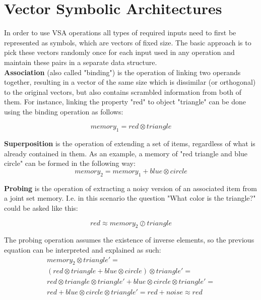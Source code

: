 \documentclass[conference]{IEEEtran}
\begin{document}
	\section{Vector Symbolic Architectures}
	
In order to use VSA operations all types of required inputs need to first be represented as symbols, which are vectors of fixed size. The basic approach is to pick these vectors randomly once for each input used in any operation and maintain these pairs in a separate data structure.	
	\\
	
	\textbf{Association} (also called "binding") is the operation of linking two operands together, resulting in a vector of the same size which is dissimilar (or orthogonal) to the original vectors, but also contains scrambled information from both of them.
For instance, linking the property "red" to object "triangle" can be done using the binding operation as follows:
	
	\begin{equation}
	memory_1 = red \otimes triangle
	\end{equation}
	
	\textbf{Superposition} is the operation of extending a set of items, regardless of what is already contained in them.
As an example, a memory of "red triangle and blue circle" can be formed in the following way:
	\begin{equation}
	memory_2 = memory_1 + blue \otimes circle
	\end{equation}
	
	\textbf{Probing} is the operation of extracting a noisy version of an associated item from a joint set memory.
I.e. in this scenario the question "What color is the triangle?" could be asked like this:
	
	\begin{equation}
	red \approx memory_2 \oslash triangle
	\end{equation}
	
	
	The probing operation assumes the existence of inverse elements, so the previous equation can be interpreted and explained as such:
	\begin{multline}
	memory_2 \otimes triangle'=\\
	(red \otimes triangle + blue \otimes circle) \otimes triangle'=\\
	red \otimes triangle  \otimes triangle' + blue \otimes circle \otimes triangle' =\\
	red + blue \otimes circle \otimes triangle'  = red + noise
	\approx red
	\end{multline}
	
\end{document}
